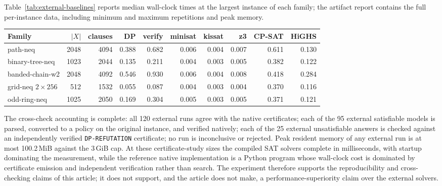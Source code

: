 \documentclass[11pt]{article}
\theoremstyle{plain}
\theoremstyle{definition}
\theoremstyle{remark}
\begin{document}
Table~\ref{tab:external-baselines} reports median wall-clock times at the
largest instance of each family; the artifact report contains the full
per-instance data, including minimum and maximum repetitions and peak memory.

\begin{center}
\begin{tabular}{@{}lrrrrrrrrr@{}}
\toprule
Family & $|X|$ & clauses & DP & verify & minisat & kissat & z3 & CP-SAT & HiGHS\\
\midrule
path-neq & 2048 & 4094 & 0.388 & 0.682 & 0.006 & 0.004 & 0.007 & 0.611 & 0.130\\
binary-tree-neq & 1023 & 2044 & 0.135 & 0.211 & 0.004 & 0.003 & 0.005 & 0.382 & 0.122\\
banded-chain-w2 & 2048 & 4092 & 0.546 & 0.930 & 0.006 & 0.004 & 0.008 & 0.418 & 0.284\\
grid-neq $2\times 256$ & 512 & 1532 & 0.055 & 0.087 & 0.004 & 0.003 & 0.004 & 0.370 & 0.116\\
odd-ring-neq & 1025 & 2050 & 0.169 & 0.304 & 0.005 & 0.003 & 0.005 & 0.371 & 0.121\\
\bottomrule
\end{tabular}
\label{tab:external-baselines}
\end{center}

The cross-check accounting is complete: all 120 external runs agree with the
native certificates; each of the 95 external satisfiable models is parsed,
converted to a policy on the original instance, and verified natively; each of
the 25 external unsatisfiable answers is checked against an independently
verified \texttt{DP-REFUTATION} certificate; no run is inconclusive or
rejected.  Peak resident memory of any external run is at most 100.2\,MiB
against the 3\,GiB cap.  At these certificate-study sizes the
compiled SAT solvers complete in milliseconds, with startup dominating the
measurement, while the reference native implementation is a Python program
whose wall-clock cost is dominated by certificate emission and independent
verification rather than search.  The experiment therefore supports the
reproducibility and cross-checking claims of this article; it does not support,
and the article does not make, a performance-superiority claim over the
external solvers.
\end{document}
